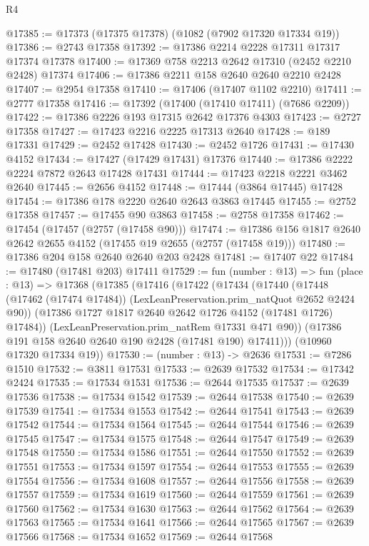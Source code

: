 \begin{lexlean}{R4}
\begin{coremodule}
@17385 := @17373 (@17375 @17378) (@1082 (@7902 @17320 @17334 @19))
@17386 := @2743 @17358
@17392 := @17386 @2214 @2228 @17311 @17317 @17374 @17378
@17400 := @17369 @758 @2213 @2642 @17310 (@2452 @2210 @2428) @17374
@17406 := @17386 @2211 @158 @2640 @2640 @2210 @2428
@17407 := @2954 @17358
@17410 := @17406 (@17407 @1102 @2210)
@17411 := @2777 @17358
@17416 := @17392 (@17400 (@17410 @17411) (@7686 @2209))
@17422 := @17386 @2226 @193 @17315 @2642 @17376 @4303
@17423 := @2727 @17358
@17427 := @17423 @2216 @2225 @17313 @2640
@17428 := @189 @17331
@17429 := @2452 @17428
@17430 := @2452 @1726
@17431 := @17430 @4152
@17434 := @17427 (@17429 @17431) @17376
@17440 := @17386 @2222 @2224 @7872 @2643 @17428 @17431
@17444 := @17423 @2218 @2221 @3462 @2640
@17445 := @2656 @4152
@17448 := @17444 (@3864 @17445) @17428
@17454 := @17386 @178 @2220 @2640 @2643 @3863 @17445
@17455 := @2752 @17358
@17457 := @17455 @90 @3863
@17458 := @2758 @17358
@17462 := @17454 (@17457 (@2757 (@17458 @90)))
@17474 := @17386 @156 @1817 @2640 @2642 @2655 @4152 (@17455 @19 @2655 (@2757 (@17458 @19)))
@17480 := @17386 @204 @158 @2640 @2640 @203 @2428
@17481 := @17407 @22
@17484 := @17480 (@17481 @203) @17411
@17529 := fun (number : @13) =>
  fun (place : @13) =>
  @17368
    (@17385
      (@17416
        (@17422
          (@17434
            (@17440
              (@17448 (@17462 (@17474 @17484)) (LexLeanPreservation.prim_natQuot @2652 @2424 @90))
              (@17386 @1727 @1817 @2640 @2642 @1726 @4152 (@17481 @1726) @17484))
            (LexLeanPreservation.prim_natRem @17331 @471 @90))
          (@17386 @191 @158 @2640 @2640 @190 @2428 (@17481 @190) @17411)))
      (@10960 @17320 @17334 @19))
@17530 := (number : @13) -> @2636
@17531 := @7286 @1510
@17532 := @3811 @17531
@17533 := @2639 @17532
@17534 := @17342 @2424
@17535 := @17534 @1531
@17536 := @2644 @17535
@17537 := @2639 @17536
@17538 := @17534 @1542
@17539 := @2644 @17538
@17540 := @2639 @17539
@17541 := @17534 @1553
@17542 := @2644 @17541
@17543 := @2639 @17542
@17544 := @17534 @1564
@17545 := @2644 @17544
@17546 := @2639 @17545
@17547 := @17534 @1575
@17548 := @2644 @17547
@17549 := @2639 @17548
@17550 := @17534 @1586
@17551 := @2644 @17550
@17552 := @2639 @17551
@17553 := @17534 @1597
@17554 := @2644 @17553
@17555 := @2639 @17554
@17556 := @17534 @1608
@17557 := @2644 @17556
@17558 := @2639 @17557
@17559 := @17534 @1619
@17560 := @2644 @17559
@17561 := @2639 @17560
@17562 := @17534 @1630
@17563 := @2644 @17562
@17564 := @2639 @17563
@17565 := @17534 @1641
@17566 := @2644 @17565
@17567 := @2639 @17566
@17568 := @17534 @1652
@17569 := @2644 @17568

\end{coremodule}
\end{lexlean}
